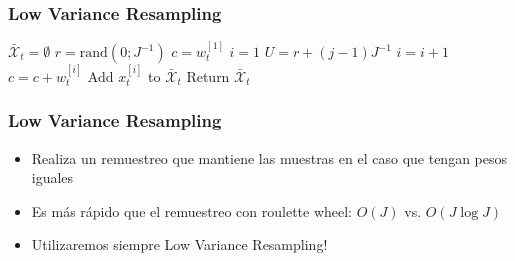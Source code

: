 \begin{frame}
    \frametitle{Low Variance Resampling}

    \begin{algorithmic}[1]
        \State $\bar{\mathcal{X}}_t = \emptyset$
        \State $r = \text{rand}(0; J^{-1})$
        \State $c = w_t^{[1]}$
        \State $i = 1$
            \State $U = r + (j - 1)  J^{-1}$
                \State $i = i + 1$
                \State $c = c + w_t^{[i]}$
            \EndWhile
            \State Add $x_t^{[i]}$ to $\bar{\mathcal{X}}_t$
        \EndFor
        \State Return $\bar{\mathcal{X}}_t$
        \EndProcedure
    \end{algorithmic}


\end{frame}

\begin{frame}
    \frametitle{Low Variance Resampling}

    \begin{itemize}
        \item Realiza un remuestreo que mantiene las muestras en el caso que tengan pesos iguales
        \item Es más rápido que el remuestreo con roulette wheel: $O(J)$ vs. $O(J \log J)$
        \item \alert{Utilizaremos siempre Low Variance Resampling!}
    \end{itemize}
\end{frame}


